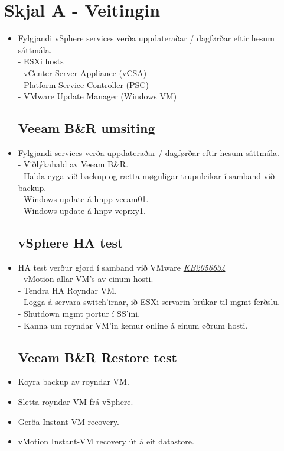 \section{Skjal A - Veitingin}
\begin{itemize}

\subsection*{vSphere umsiting}
	\item Fylgjandi vSphere services verða uppdateraðar / dagførðar eftir hesum sáttmála. \\
	- ESXi hosts							\\
	- vCenter Server Appliance (vCSA)		\\
	- Platform Service Controller (PSC)	\\
	- VMware Update Manager (Windows VM)
	
\subsection*{Veeam B\&R umsiting}
	\item Fylgjandi services verða uppdateraðar / dagførðar eftir hesum sáttmála.	\\
	- Viðlýkahald av Veeam B\&R.		\\
	- Halda eyga við backup og rætta møguligar trupuleikar í samband við backup.	\\
	- Windows update á hnpp-veeam01.	\\
	- Windows update á hnpv-veprxy1.
	
\subsection*{vSphere HA test}
	\item HA test verður gjørd í samband við VMware \href{kb.vmware.com/kb/2056634}{\textit{KB2056634}}\\
	- vMotion allar VM's av einum hosti. \\
	- Tendra HA Royndar VM. \\
	- Logga á servara switch'irnar, ið ESXi servarin brúkar til mgmt ferðslu. \\
	- Shutdown mgmt portur í SS'ini. \\
	- Kanna um royndar VM'in kemur online á einum øðrum hosti.
	
\subsection*{Veeam B\&R Restore test}
	\item Koyra backup av royndar VM.
	\item Sletta royndar VM frá vSphere.
	\item Gerða Instant-VM recovery.
	\item vMotion Instant-VM recovery út á eit datastore.
\end{itemize}

